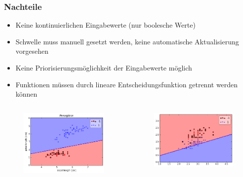 \begin{frame}
\frametitle{Nachteile}

\begin{itemize}
\item Keine kontinuierlichen Eingabewerte (nur boolesche Werte)
\item Schwelle muss manuell gesetzt werden, keine automatische Aktualisierung vorgesehen
\item Keine Priorisierungsmöglichkeit der Eingabewerte möglich
\item Funktionen müssen durch lineare Entscheidungsfunktion getrennt werden können
\end{itemize}

\begin{columns}
\begin{figure}
	\includegraphics[width=\linewidth]{./geschichtliches/mcCullochPittsNeuron/img/perceptron_klassifizierung1}
\end{figure}

\begin{figure}
	\includegraphics[width=\linewidth]{./geschichtliches/mcCullochPittsNeuron/img/perceptron_klassifizierung2}
\end{figure}


\end{columns}

\end{frame}
